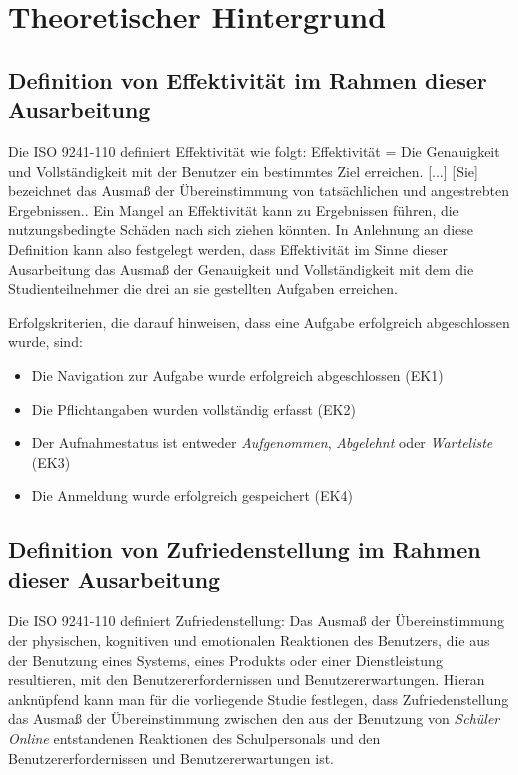 \section{Theoretischer Hintergrund}
\subsection{Definition von Effektivität im Rahmen dieser Ausarbeitung }
Die ISO 9241-110 definiert Effektivität wie folgt: \glqq Effektivität = Die Genauigkeit und Vollständigkeit mit der Benutzer ein bestimmtes Ziel erreichen. [...] [Sie] bezeichnet das Ausmaß der Übereinstimmung von tatsächlichen und angestrebten Ergebnissen.\grqq{}\cite{ISO-9241-110}. Ein \glqq Mangel an Effektivität kann zu Ergebnissen führen, die nutzungsbedingte Schäden nach sich ziehen könnten.\grqq{}\cite{ISO-9241-110}
In Anlehnung an diese Definition kann also festgelegt werden, dass Effektivität im Sinne dieser Ausarbeitung das Ausmaß der Genauigkeit und Vollständigkeit mit dem die Studienteilnehmer die drei an sie gestellten Aufgaben erreichen. 

Erfolgskriterien, die darauf hinweisen, dass eine Aufgabe erfolgreich abgeschlossen wurde, sind: 
\begin{itemize}
    \item Die Navigation zur Aufgabe wurde erfolgreich abgeschlossen (EK1)
    \item Die Pflichtangaben wurden vollständig erfasst (EK2)
    \item Der Aufnahmestatus ist entweder \textit{Aufgenommen}, \textit{Abgelehnt} oder \textit{Warteliste} (EK3)
    \item Die Anmeldung wurde erfolgreich gespeichert (EK4)
\end{itemize}

\subsection{Definition von Zufriedenstellung im Rahmen dieser Ausarbeitung}
Die ISO 9241-110 definiert Zufriedenstellung: \glqq Das Ausmaß der Übereinstimmung der physischen, kognitiven und emotionalen Reaktionen des Benutzers, die aus der Benutzung eines Systems, eines Produkts oder einer Dienstleistung resultieren, mit den Benutzererfordernissen und Benutzererwartungen.\grqq{}\cite{ISO-9241-110} Hieran anknüpfend kann man für die vorliegende Studie festlegen, dass Zufriedenstellung das Ausmaß der Übereinstimmung zwischen den aus der Benutzung von \textit{Schüler Online} entstandenen Reaktionen des Schulpersonals und den Benutzererfordernissen und Benutzererwartungen ist. 

